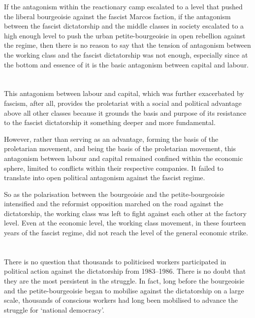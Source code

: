 If the antagonism within the reactionary camp 
escalated to a level that
pushed the liberal bourgeoisie against the fascist Marcos faction, 
if the antagonism between the fascist dictatorship 
and the middle classes in society 
escalated to a high enough level 
to push the urban petite-bourgeoisie 
in open rebellion against the regime, 
then there is no reason to say that the tension of antagonism 
between the working class and the fascist dictatorship was not enough, 
especially since at the bottom and essence of it 
is the basic antagonism between capital and labour.


\section{}
This antagonism between labour and capital, 
which was further exacerbated by fascism, 
after all, 
provides the proletariat with 
a social and political advantage
above all other classes
because it grounds the basis and purpose of its resistance 
to the fascist dictatorship 
it something deeper and more fundamental.

However, rather than serving as an advantage,
forming the basis of the proletarian movement, 
and being the basis of the proletarian movement, 
this antagonism between labour and capital 
remained confined within the economic sphere,
limited to conflicts within their respective companies.
It failed to translate into open political antagonism against the fascist regime.

So as the polarisation between the bourgeoisie 
and the petite-bourgeoisie intensified 
and the reformist opposition marched on the road against the dictatorship, 
the working class was left to fight against each other at the factory level. 
Even at the economic level, 
the working class movement, 
in these fourteen years of the fascist regime, 
did not reach the level of the general economic strike.


\section{}
There is no question 
that thousands to politicised workers 
participated in political action 
against the dictatorship from 1983--1986.
There is no doubt
that they are the most persistent in the struggle.
In fact, 
long before the bourgeoisie and the petite-bourgeoisie 
began to mobilise against the dictatorship on a large scale,
thousands of conscious workers had long been mobilised
to advance the struggle for `national democracy'.

